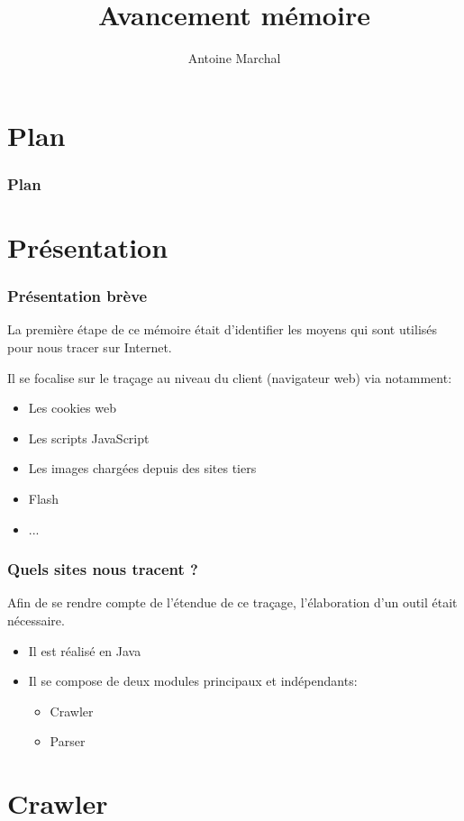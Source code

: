 \documentclass[compress]{beamer}
\title{Avancement mémoire}
\author{Antoine Marchal}
\begin{document}
  \begin{frame}
  \titlepage
  \end{frame}

  \section*{Plan}
  \begin{frame}
  \frametitle{Plan}
    \tableofcontents[]
  \end{frame} 

  \section{Présentation}
  \begin{frame}
  \frametitle{Présentation brève}
  La première étape de ce mémoire était d'identifier les moyens qui sont utilisés pour nous tracer sur Internet.
  
  Il se focalise sur le traçage au niveau du client (navigateur web) via notamment:
    \begin{itemize}
      \item Les cookies web
      \item Les scripts JavaScript
      \item Les images chargées depuis des sites tiers
      \item Flash
      \item ...
    \end{itemize}
  \end{frame}

  \begin{frame}
  \frametitle{Quels sites nous tracent ?}
  Afin de se rendre compte de l'étendue de ce traçage, l'élaboration d'un outil était nécessaire.
   \begin{itemize}
    \item Il est réalisé en Java
    \item Il se compose de deux modules principaux et indépendants:
      \begin{itemize}
        \item Crawler
        \item Parser
      \end{itemize}
    \end{itemize}
  \end{frame}
  
  \section{Crawler}
\end{document}
